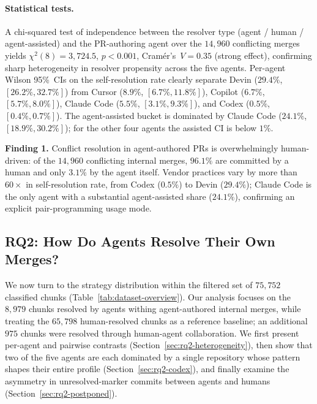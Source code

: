 \documentclass[sigconf,anonymous]{acmart}
\begin{document}
\paragraph{Statistical tests.} A chi-squared test of independence between the resolver type (agent / human / agent-assisted) and the PR-authoring agent over the $14{,}960$ conflicting merges yields $\chi^2(8){=}3{,}724.5$, \linebreak $p{<}0.001$, Cram\'{e}r's~$V{=}0.35$ (strong effect), confirming sharp heterogeneity in resolver propensity across the five agents. Per-agent Wilson 95\%~CIs on the self-resolution rate clearly separate Devin ($29.4\%$, $[26.2\%, 32.7\%]$) from Cursor ($8.9\%$, $[6.7\%, 11.8\%]$), Copilot ($6.7\%$, $[5.7\%, 8.0\%]$), Claude Code ($5.5\%$, $[3.1\%, 9.3\%]$), and Codex ($0.5\%$, $[0.4\%, 0.7\%]$). The agent-assisted bucket is dominated by Claude Code ($24.1\%$, $[18.9\%, 30.2\%]$); for the other four agents the assisted CI is below $1\%$.

\begin{findingbox}
\textbf{Finding 1.} Conflict resolution in agent-authored PRs is overwhelmingly human-driven: of the $14{,}960$ conflicting internal merges, $96.1\%$ are committed by a human and only $3.1\%$ by the agent itself. Vendor practices vary by more than $60{\times}$ in self-resolution rate, from Codex ($0.5\%$) to Devin ($29.4\%$); Claude Code is the only agent with a substantial agent-assisted share ($24.1\%$), confirming an explicit pair-programming usage mode.
\end{findingbox}

\subsection{RQ2: How Do Agents Resolve Their Own Merges?}
\label{sec:rq2}

We now turn to the strategy distribution within the filtered set of $75{,}752$ classified chunks (Table~\ref{tab:dataset-overview}). Our analysis focuses on the $8{,}979$ chunks resolved by agents withing agent-authored internal merges, while treating the $65{,}798$ human-resolved chunks as a reference baseline; an additional $975$ chunks were resolved through human-agent collaboration. We first present per-agent and pairwise contrasts (Section~\ref{sec:rq2-heterogeneity}), then show that two of the five agents are each dominated by a single repository whose pattern shapes their entire profile (Section~\ref{sec:rq2-codex}), and finally examine the asymmetry in unresolved-marker commits between agents and humans (Section~\ref{sec:rq2-postponed}).
\end{document}
